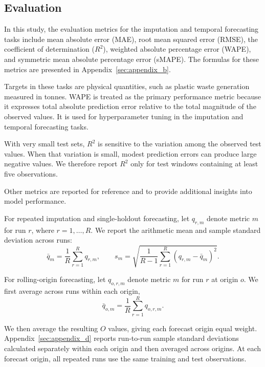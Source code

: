\subsection{Evaluation}

In this study, the evaluation metrics for the imputation and temporal forecasting tasks include mean absolute error (MAE), root mean squared error (RMSE), the coefficient of determination (\(R^2\)), weighted absolute percentage error (WAPE), and symmetric mean absolute percentage error (sMAPE).
The formulas for these metrics are presented in Appendix~\ref{sec:appendix_b}.

Targets in these tasks are physical quantities, such as plastic waste generation measured in tonnes.
WAPE is treated as the primary performance metric because it expresses total absolute prediction error relative to the total magnitude of the observed values.
It is used for hyperparameter tuning in the imputation and temporal forecasting tasks.

With very small test sets, \(R^2\) is sensitive to the variation among the observed test values.
When that variation is small, modest prediction errors can produce large negative values.
We therefore report \(R^2\) only for test windows containing at least five observations.

Other metrics are reported for reference and to provide additional insights into model performance.

For repeated imputation and single-holdout forecasting, let \(q_{r,m}\) denote metric \(m\) for run \(r\), where
\(r=1,\ldots,R\).
We report the arithmetic mean and sample standard deviation across
runs:
\[
	\bar{q}_m = \frac{1}{R}\sum_{r=1}^{R}q_{r,m},
	\qquad
	s_m =
	\sqrt{\frac{1}{R-1}\sum_{r=1}^{R}
		(q_{r,m}-\bar{q}_m)^2}.
\]

For rolling-origin forecasting, let \(q_{o,r,m}\) denote metric \(m\) for run \(r\) at origin \(o\).
We first average across runs within each origin,
\[
	\bar{q}_{o,m} = \frac{1}{R}\sum_{r=1}^{R}q_{o,r,m}.
\]

We then average the resulting \(O\) values, giving each forecast origin equal weight.
Appendix~\ref{sec:appendix_d} reports run-to-run sample standard deviations calculated separately within each origin and then averaged across origins.
At each forecast origin, all repeated runs use the same training and test observations.
